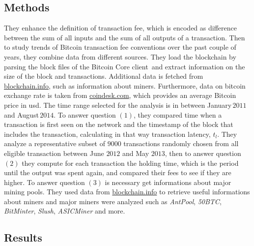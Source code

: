 \documentclass[USenglish]{uit-thesis}
\begin{document}
\subsection{Methods}
They enhance the definition of transaction fee, which is encoded
as difference between the sum of all inputs and the sum of all outputs
of a transaction. Then to study trends of Bitcoin transaction fee
conventions over the past couple of years, they combine data from
different sources. They load the blockchain by parsing
the block files of the Bitcoin Core client\,\cite{bitcoincore}
and extract information on the size of the block and transactions.
Additional data is fetched from \url{blockchain.info}, such as
information about miners. Furthermore, data on bitcoin exchange rate
is taken from \url{coindesk.com}, which provides an average Bitcoin
price in \gls{usd}. The time range selected for the analysis
is in between January\,$2011$ and August\,$2014$. To answer
question $(1)$, they compared time when a transaction is first
seen on the network and the timestamp of the block that includes
the transaction, calculating in that way transaction latency, $t_l$.
They analyze a representative subset of $9000$ transactions
randomly chosen from all eligible transaction between June
$2012$ and May $2013$, then to answer question $(2)$ they
compute for each transaction the holding time, which is the period
until the output was spent again, and compared their fees to see if
they are higher. To answer question $(3)$ is necessary get
informations about major mining pools. They used data
from \url{blockchain.info} to retrieve useful informations about miners
and major miners were analyzed such as \emph{AntPool}, \emph{50BTC},
\emph{BitMinter}, \emph{Slush}, \emph{ASICMiner} and more.
\subsection{Results}
\end{document}
